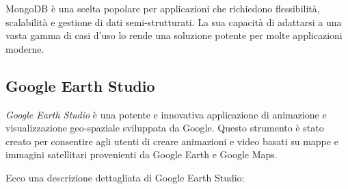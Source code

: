 MongoDB è una scelta popolare per applicazioni che richiedono flessibilità, scalabilità e gestione di dati semi-strutturati. La sua capacità di adattarsi a una vasta gamma di casi d'uso lo rende una soluzione potente per molte applicazioni moderne.

\subsection{Google Earth Studio}

\textit{Google Earth Studio} è una potente e innovativa applicazione di animazione e visualizzazione geo-spaziale sviluppata da Google. Questo strumento è stato creato per consentire agli utenti di creare animazioni e video basati su mappe e immagini satellitari provenienti da Google Earth e Google Maps. 

Ecco una descrizione dettagliata di Google Earth Studio:


